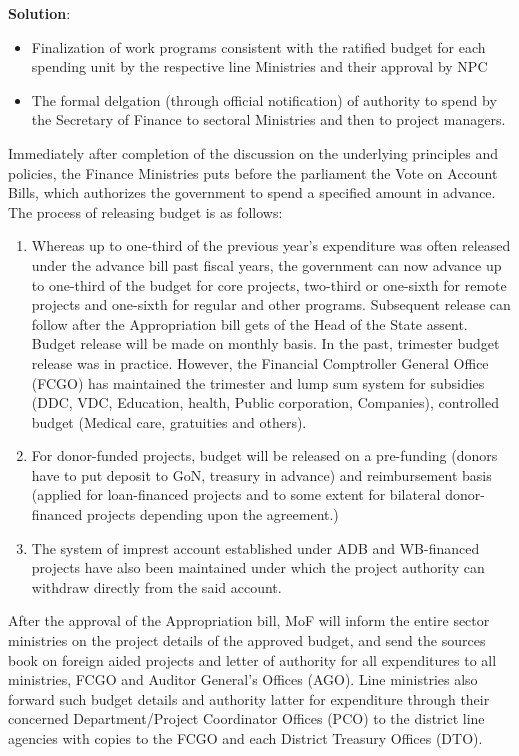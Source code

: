 \documentclass[
  openany]{book}
\newenvironment{solution}{ {\bfseries Solution}:}{}
\begin{document}
\begin{questions}
\begin{solution}
\begin{itemize}
\item Finalization of work programs consistent with the ratified budget for each spending unit by the respective line Ministries and their approval by NPC
\item The formal delgation (through official notification) of authority to spend by the Secretary of Finance to sectoral Ministries and then to project managers.
\end{itemize}

Immediately after completion of the discussion on the underlying principles and policies, the Finance Ministries puts before the parliament the Vote on Account Bills, which authorizes the government to spend a specified amount in advance. The process of releasing budget is as follows:

\begin{enumerate}
\item Whereas up to one-third of the previous year's expenditure was often released under the advance bill past fiscal years, the government can now advance up to one-third of the budget for core projects, two-third or one-sixth for remote projects and one-sixth for regular and other programs. Subsequent release can follow after the Appropriation bill gets of the Head of the State assent. Budget release will be made on monthly basis. In the past, trimester budget release was in practice. However, the Financial Comptroller General Office (FCGO) has maintained the trimester and lump sum system for subsidies (DDC, VDC, Education, health, Public corporation, Companies), controlled budget (Medical care, gratuities and others).
\item For donor-funded projects, budget will be released on a pre-funding (donors have to put deposit to GoN, treasury in advance) and reimbursement basis (applied for loan-financed projects and to some extent for bilateral donor-financed projects depending upon the agreement.)
\item The system of imprest account established under ADB and WB-financed projects have also been maintained under which the project authority can withdraw directly from the said account.
\end{enumerate}

After the approval of the Appropriation bill, MoF will inform the entire sector ministries on the project details of the approved budget, and send the sources book on foreign aided projects and letter of authority for all expenditures to all ministries, FCGO and Auditor General's Offices (AGO). Line ministries also forward such budget details and authority latter for expenditure through their concerned Department/Project Coordinator Offices (PCO) to the district line agencies with copies to the FCGO and each District Treasury Offices (DTO).


\end{solution}
\end{questions}
\end{document}
